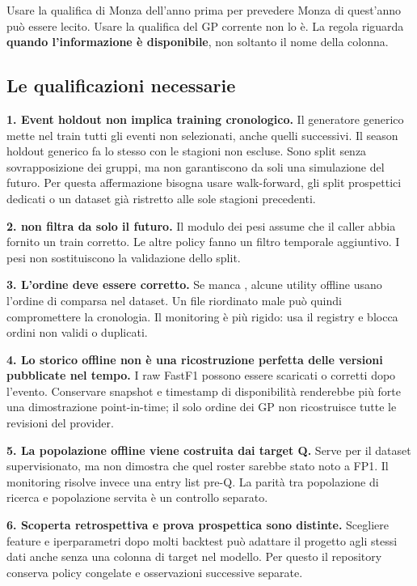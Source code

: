 \documentclass[11pt,a4paper]{article}
\newcommand{\code}[1]{{\ttfamily\small\seqsplit{#1}}}
\begin{document}
Usare la qualifica di Monza dell'anno prima per prevedere Monza di quest'anno può essere lecito. Usare la qualifica del GP corrente non lo è. La regola riguarda \textbf{quando l'informazione è disponibile}, non soltanto il nome della colonna.

\subsection{Le qualificazioni necessarie}\label{le-qualificazioni-necessarie}

\textbf{1. Event holdout non implica training cronologico.} Il generatore generico mette nel train tutti gli eventi non selezionati, anche quelli successivi. Il season holdout generico fa lo stesso con le stagioni non escluse. Sono split senza sovrapposizione dei gruppi, ma non garantiscono da soli una simulazione del futuro. Per questa affermazione bisogna usare walk-forward, gli split prospettici dedicati o un dataset già ristretto alle sole stagioni precedenti.

\textbf{2. \code{uniform} non filtra da solo il futuro.} Il modulo dei pesi assume che il caller abbia fornito un train corretto. Le altre policy fanno un filtro temporale aggiuntivo. I pesi non sostituiscono la validazione dello split.

\textbf{3. L'ordine deve essere corretto.} Se manca \code{event\_order}, alcune utility offline usano l'ordine di comparsa nel dataset. Un file riordinato male può quindi compromettere la cronologia. Il monitoring è più rigido: usa il registry e blocca ordini non validi o duplicati.

\textbf{4. Lo storico offline non è una ricostruzione perfetta delle versioni pubblicate nel tempo.} I raw FastF1 possono essere scaricati o corretti dopo l'evento. Conservare snapshot e timestamp di disponibilità renderebbe più forte una dimostrazione point-in-time; il solo ordine dei GP non ricostruisce tutte le revisioni del provider.

\textbf{5. La popolazione offline viene costruita dai target Q.} Serve per il dataset supervisionato, ma non dimostra che quel roster sarebbe stato noto a FP1. Il monitoring risolve invece una entry list pre-Q. La parità tra popolazione di ricerca e popolazione servita è un controllo separato.

\textbf{6. Scoperta retrospettiva e prova prospettica sono distinte.} Scegliere feature e iperparametri dopo molti backtest può adattare il progetto agli stessi dati anche senza una colonna di target nel modello. Per questo il repository conserva policy congelate e osservazioni successive separate.
\end{document}
